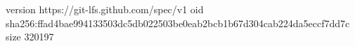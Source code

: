 version https://git-lfs.github.com/spec/v1
oid sha256:ffad4bae994133503dc5db022503be0eab2bcb1b67d304cab224da5eccf7dd7c
size 320197
